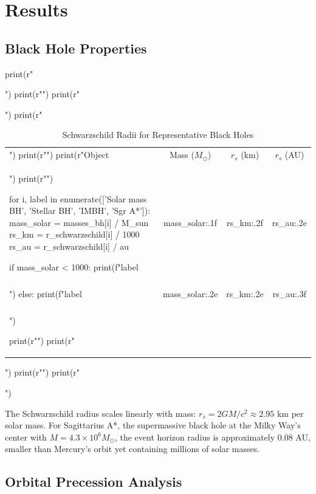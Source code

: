 \documentclass[a4paper, 11pt]{article}
\begin{document}
\section{Results}

\subsection{Black Hole Properties}

\begin{pycode}
print(r"\begin{table}[htbp]")
print(r"\centering")
print(r"\caption{Schwarzschild Radii for Representative Black Holes}")
print(r"\begin{tabular}{lccc}")
print(r"\toprule")
print(r"Object & Mass ($M_\odot$) & $r_s$ (km) & $r_s$ (AU) \\")
print(r"\midrule")

for i, label in enumerate(['Solar mass BH', 'Stellar BH', 'IMBH', 'Sgr A*']):
    mass_solar = masses_bh[i] / M_sun
    rs_km = r_schwarzschild[i] / 1000
    rs_au = r_schwarzschild[i] / au

    if mass_solar < 1000:
        print(f"{label} & {mass_solar:.1f} & {rs_km:.2f} & {rs_au:.2e} \\\\")
    else:
        print(f"{label} & {mass_solar:.2e} & {rs_km:.2e} & {rs_au:.3f} \\\\")

print(r"\bottomrule")
print(r"\end{tabular}")
print(r"\label{tab:black_holes}")
print(r"\end{table}")
\end{pycode}

The Schwarzschild radius scales linearly with mass: $r_s = 2GM/c^2 \approx 2.95$ km per
solar mass. For Sagittarius A*, the supermassive black hole at the Milky Way's center with
$M = 4.3 \times 10^6 M_\odot$, the event horizon radius is approximately 0.08 AU, smaller
than Mercury's orbit yet containing millions of solar masses.

\subsection{Orbital Precession Analysis}
\end{document}
